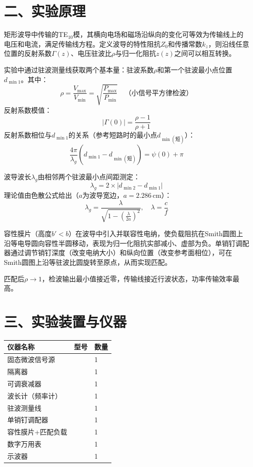 \documentclass[12pt,a4paper]{article}
\begin{document}
\section*{二、实验原理}
矩形波导中传输的TE$_{10}$模，其横向电场和磁场沿纵向的变化可等效为传输线上的电压和电流，满足传输线方程。定义波导的特性阻抗$Z_0$和传播常数$k_z$，则沿线任意位置的反射系数$\Gamma(z)$、电压驻波比$\rho$与归一化阻抗$z(z)$之间可以相互转换。

实验中通过驻波测量线获取两个基本量：驻波系数$\rho$和第一个驻波最小点位置$d_{\min1}$。其中：
\[
\rho = \frac{V_{\max}}{V_{\min}} = \sqrt{\frac{P_{\max}}{P_{\min}}} \quad \text{（小信号平方律检波）}
\]
反射系数模值：
\[
|\Gamma(0)| = \frac{\rho-1}{\rho+1}
\]
反射系数相位与$d_{\min1}$的关系（参考短路时的最小点$d_{\min(\text{短})}$）：
\[
\frac{4\pi}{\lambda_g} (d_{\min1} - d_{\min(\text{短})}) = \psi(0) + \pi
\]

波导波长$\lambda_g$由相邻两个驻波最小点间距测定：
\[
\lambda_g = 2 \times |d_{\min2} - d_{\min1}|
\]
理论值由色散公式给出（$a$为波导宽边，$a=2.286\,\text{cm}$）：
\[
\lambda_g = \frac{\lambda}{\sqrt{1-\left(\frac{\lambda}{2a}\right)^2}}, \quad \lambda = \frac{c}{f}
\]

容性膜片（高度$b' < b$）在波导中引入并联容性电纳，使负载阻抗在Smith圆图上沿等电导圆向容性半圆移动，表现为归一化阻抗实部减小、虚部为负。单销钉调配器通过调节销钉深度（改变电纳大小）和纵向位置（改变参考面相位），可在Smith圆图上沿等驻波比圆旋转至原点，从而实现匹配。

匹配后$\rho \to 1$，检波输出最小值接近零，传输线接近行波状态，功率传输效率最高。

\section*{三、实验装置与仪器}
\begin{table}[H]
\centering
\begin{tabular}{p{5cm}p{4cm}p{3cm}}
\toprule
仪器名称 & 型号 & 数量 \\
\midrule
固态微波信号源 & & 1 \\
隔离器 & & 1 \\
可调衰减器 & & 1 \\
波长计（频率计） & & 1 \\
驻波测量线 & & 1 \\
单销钉调配器 & & 1 \\
容性膜片+匹配负载 & & 1 \\
数字万用表 & & 1 \\
示波器 & & 1 \\
\bottomrule
\end{tabular}
\end{table}
\end{document}
